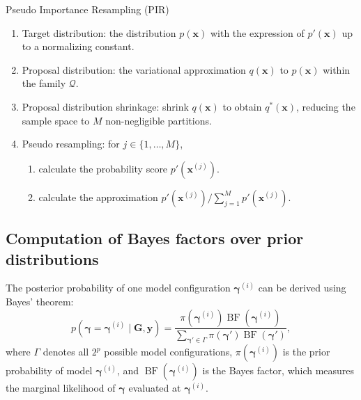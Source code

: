 \documentclass[pdflatex,sn-mathphys-num]{sn-jnl}%
\theoremstyle{thmstyleone}%
\theoremstyle{thmstyletwo}%
\theoremstyle{thmstylethree}%
\begin{document}
\begin{algorithm}
\caption{Pseudo Importance Resampling (PIR)}
\label{alg:variational_pir}
\begin{enumerate}
    \item Target distribution: the distribution $p\left(\mathbf{x}\right)$ with the expression of \(p'\left(\mathbf{x}\right)\) up to a normalizing constant.
    \item Proposal distribution: the variational approximation \( q\left(\mathbf{x}\right) \) to \( p\left(\mathbf{x}\right) \) within the family $\mathcal{Q}$.
    \item Proposal distribution shrinkage: shrink $q\left(\mathbf{x}\right)$ to obtain $q^*\left(\mathbf{x}\right)$, reducing the sample space to $M$ non-negligible partitions.
    \item Pseudo resampling: for \( j \in \{1, \dots, M\} \),
    \begin{enumerate}
        \item calculate the probability score \( p'\left(\mathbf{x}^{(j)}\right) \).
        \item calculate the approximation \( p'\left(\mathbf{x}^{(j)}\right)/ \sum_{j=1}^{M}p'\left(\mathbf{x}^{(j)}\right) \).
    \end{enumerate}
\end{enumerate}
\end{algorithm}

\subsection{Computation of Bayes factors over prior distributions}
The posterior probability of one model configuration $\boldsymbol{\gamma}^{(i)}$ can be derived using Bayes' theorem:
$$p\left(\boldsymbol{\gamma} = \boldsymbol{\gamma}^{(i)} \mid \mathbf{G},\mathbf{y}\right)     =\frac{\pi\left(\boldsymbol{\gamma}^{(i)}\right)\operatorname{BF}\left(\boldsymbol{\gamma}^{(i)}\right)}{\sum_{\boldsymbol{\gamma}'\in \Gamma}\pi \left(\boldsymbol{\gamma}'\right)\operatorname{BF}\left(\boldsymbol{\gamma}'\right)},$$
where $\Gamma$ denotes all $2^p$ possible model configurations, $\pi\left(\boldsymbol{\gamma}^{(i)}\right)$ is the prior probability of model $\boldsymbol{\gamma}^{(i)}$, and $\operatorname{BF}\left(\boldsymbol{\gamma}^{(i)}\right)$ is the Bayes factor, which measures the marginal likelihood of $\boldsymbol{\gamma}$ evaluated at $\boldsymbol{\gamma}^{(i)}$.
\end{document}
